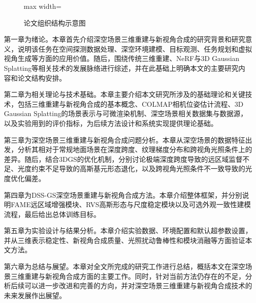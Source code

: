 \begin{figure}[H]
\begin{adjustbox}{max width=\textwidth}
    \end{adjustbox}
    \caption{论文组织结构示意图}\label{fig:1-thesis-structure}
\end{figure}





第一章为绪论。本章首先介绍深空场景三维重建与新视角合成的研究背景和研究意义，说明该任务在空间探测数据处理、深空环境建模、目标观测、任务规划和虚拟视角生成等方面的应用价值。随后，围绕传统三维重建、NeRF与3D Gaussian Splatting等相关技术的发展脉络进行综述，并在此基础上明确本文的主要研究内容和论文结构安排。

第二章为相关理论与技术基础。本章主要介绍本文研究所涉及的基础理论和关键技术，包括三维重建与新视角合成的基本概念、COLMAP相机位姿估计流程、3D Gaussian Splatting的场景表示与可微渲染机制、深空场景相关数据集与数据源，以及实验用到的评价指标，为后续方法设计和系统实现提供理论基础。

第三章为深空场景三维重建与新视角合成问题分析。本章从深空场景的数据特征出发，分析其相对于常规地面场景在深度跨度、纹理梯度分布和跨视角光照条件上的差异。随后，结合3DGS的优化机制，分别讨论极端深度跨度导致的远区域监督不足、光度约束不足导致的高斯基元形态退化，以及跨视角光照条件不一致导致的光度优化偏差。

第四章为DSS-GS深空场景重建与新视角合成方法。本章介绍整体框架，并分别说明FAME远区域增强模块、RVS高斯形态与尺度稳定模块以及可选外观一致性建模流程，最后给出总体训练目标。

第五章为实验设计与结果分析。本章介绍实验数据、环境配置和默认超参数设置，并从三维表示稳定性、新视角合成质量、光照扰动鲁棒性和模块消融等方面验证本文方法。

第六章为总结与展望。本章对全文所完成的研究工作进行总结，概括本文在深空场景三维重建与新视角合成方面的主要工作。同时，针对当前方法仍存在的不足，分析后续可以进一步改进和完善的方向，并对深空场景三维重建与新视角合成技术的未来发展作出展望。
